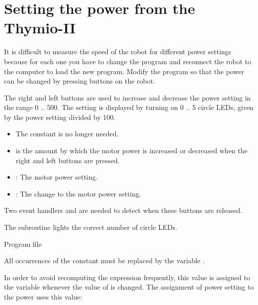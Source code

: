 \section{Setting the power from the Thymio-II}


It is difficult to measure the speed of the robot for different power
settings because for each one you have to change the program and
reconnect the robot to the computer to load the new program. Modify the
program so that the power can be changed by pressing buttons on the
robot.


The right and left buttons are used to increase and decrease the power
setting in the range 0 .. 500. The setting is displayed by turning on 0
.. 5 circle LEDs, given by the power setting divided by 100.


\begin{itemize}
\item The constant  is no longer needed.
\item {} is the amount by which the motor power is increased
or decreased when the right and left buttons are pressed.
\end{itemize}


\begin{itemize}
\item {}: The motor power setting.
\item {}: The change to the motor power setting.
\end{itemize}



Two event handlers  and  are needed to
detect when these buttons are released.

The subroutine  lights the correct number of
circle LEDs.


{\raggedleft \hfill Program file }

All occurrences of the constant  must be replaced by the
variable .

In order to avoid recomputing the expression 
frequently, this value is assigned to the variable 
whenever the value of  is changed. The assignment of power
setting to the power uses this value:

